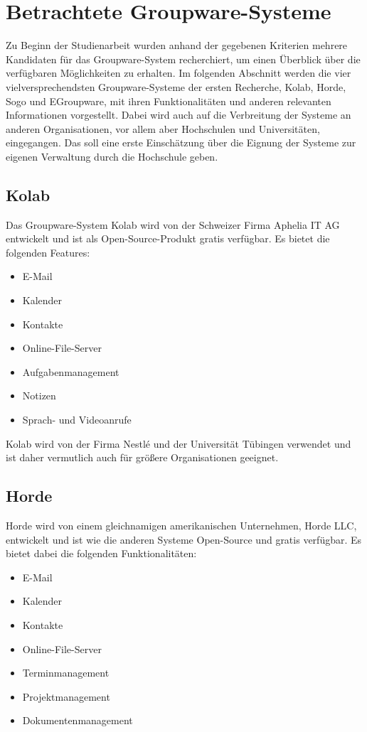 \newpage

\section{Betrachtete Groupware-Systeme}

Zu Beginn der Studienarbeit wurden anhand der gegebenen Kriterien mehrere Kandidaten für das Groupware-System recherchiert, um einen Überblick über die verfügbaren Möglichkeiten zu erhalten.
Im folgenden Abschnitt werden die vier vielversprechendsten Groupware-Systeme der ersten Recherche, Kolab, Horde, Sogo und EGroupware, mit ihren Funktionalitäten und anderen relevanten Informationen vorgestellt.
Dabei wird auch auf die Verbreitung der Systeme an anderen Organisationen, vor allem aber Hochschulen und Universitäten, eingegangen.
Das soll eine erste Einschätzung über die Eignung der Systeme zur eigenen Verwaltung durch die Hochschule geben.


\subsection{Kolab}

Das Groupware-System Kolab wird von der Schweizer Firma Aphelia IT AG entwickelt und ist als Open-Source-Produkt gratis verfügbar. Es bietet die folgenden Features:
\begin{itemize}
    \item E-Mail
    \item Kalender
    \item Kontakte
    \item Online-File-Server
    \item Aufgabenmanagement
    \item Notizen
    \item Sprach- und Videoanrufe
\end{itemize}
\autocite[][]{kolab}

Kolab wird von der Firma Nestlé und der Universität Tübingen verwendet und ist daher vermutlich auch für größere Organisationen geeignet.

\subsection{Horde}

Horde wird von einem gleichnamigen amerikanischen Unternehmen, Horde LLC, entwickelt und ist wie die anderen Systeme Open-Source und gratis verfügbar. Es bietet dabei die folgenden Funktionalitäten:
\begin{itemize}
    \item E-Mail
    \item Kalender
    \item Kontakte
    \item Online-File-Server
    \item Terminmanagement
    \item Projektmanagement
    \item Dokumentenmanagement
    
\end{itemize}
\autocite[][]{horde}

